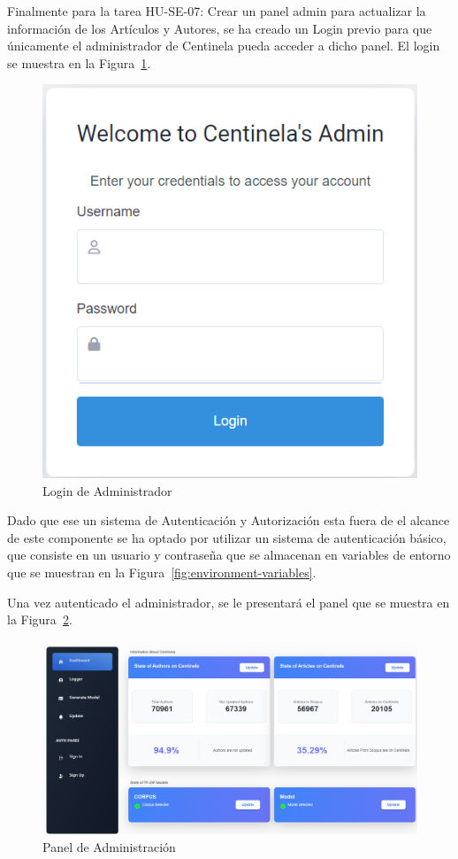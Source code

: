 Finalmente para la tarea HU-SE-07: Crear un panel admin para actualizar la información de los Artículos y Autores, se ha creado un Login previo para 
que únicamente el administrador de Centinela pueda acceder a dicho panel. El login se muestra en la Figura~\ref{fig:login-admin}.
\begin{figure}[H]
    \centering
    \includegraphics[scale=0.6]{../02Figures/02Chapter/Sprints/Sprint-5/centinela-admin.png}
    \caption{Login de Administrador}\label{fig:login-admin}
\end{figure}

Dado que ese un sistema de Autenticación y Autorización esta fuera de el alcance de este componente
se ha optado por utilizar un sistema de autenticación básico, que consiste en un usuario y contraseña que se almacenan en variables de entorno que se muestran en la Figura~\ref{fig:environment-variables}.

Una vez autenticado el administrador, se le presentará el panel que se muestra en la Figura~\ref{fig:admin-panel}.
\begin{figure}[H]
    \centering
    \includegraphics[scale=0.34]{../02Figures/02Chapter/Sprints/Sprint-5/admin-panel.png}
    \caption{Panel de Administración}\label{fig:admin-panel}
\end{figure}

